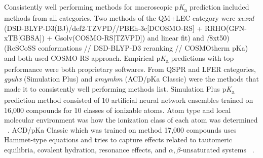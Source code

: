 \documentclass[9pt,lineno,final]{elife}
\newcommand{\pKa}{p\textit{K}\textsubscript{a}}
\begin{document}
Consistently well performing methods for macroscopic \pKa{} prediction included methods from all categories. Two methods of the QM+LEC category were \textit{xvxzd} (DSD-BLYP-D3(BJ)/def2-TZVPD//PBEh-3c[DCOSMO-RS] + RRHO(GFN-xTB[GBSA]) + Gsolv(COSMO-RS[TZVPD]) and linear fit) and \textit(8xt50) (ReSCoSS conformations // DSD-BLYP-D3 reranking // COSMOtherm pKa) and both used COSMO-RS approach. 
Empirical \pKa{} predictions with top performance were both proprietary softwares. 
From QSPR and LFER categories, \textit{gyuhx} (Simulation Plus) and \textit{xmymhm} (ACD/pKa Classic) were the methods that made it to consistently well performing methods list. Simulation Plus \pKa{} prediction method consisted of 10 artificial neural network ensembles trained on 16,000 compounds for 10 classes of ionizable atoms. Atom type and local molecular environment was how the ionization class of each atom was determined ~\citep{simulation_plus_D3R_presentation}. 
ACD/pKa Classic which was trained on method 17,000 compounds uses Hammet-type equations and tries to capture effects related to tautomeric equilibria, covalent hydration, resonance effects, and  $\alpha, \beta$-unsaturated systems ~\citep{ACD-pKa-classic}.
\end{document}
